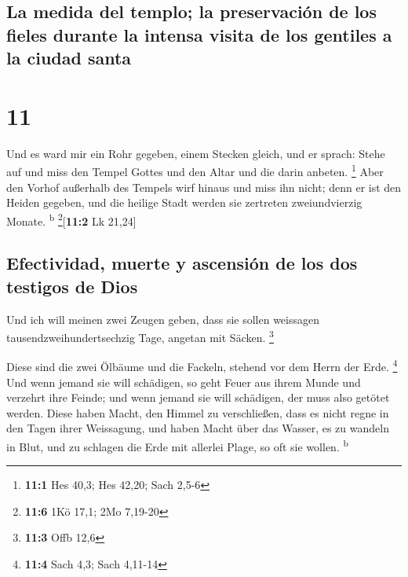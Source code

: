 \hypertarget{la-medida-del-templo-la-preservaciuxf3n-de-los-fieles-durante-la-intensa-visita-de-los-gentiles-a-la-ciudad-santa}{%
\subsection{La medida del templo; la preservación de los fieles durante
la intensa visita de los gentiles a la ciudad
santa}\label{la-medida-del-templo-la-preservaciuxf3n-de-los-fieles-durante-la-intensa-visita-de-los-gentiles-a-la-ciudad-santa}}

\hypertarget{section-10}{%
\section{11}\label{section-10}}

 Und es ward mir ein Rohr gegeben, einem Stecken gleich,
und er sprach: Stehe auf und miss den Tempel Gottes und den Altar und
die darin anbeten. \footnote{\textbf{11:1} Hes 40,3; Hes 42,20; Sach
  2,5-6}  Aber den Vorhof außerhalb des Tempels wirf
hinaus und miss ihn nicht; denn er ist den Heiden gegeben, und die
heilige Stadt werden sie zertreten zweiundvierzig Monate.
\textsuperscript{b} \footnote{\textbf{11:6} 1Kö 17,1; 2Mo 7,19-20}{[}\textbf{11:2}
Lk 21,24{]}

\hypertarget{efectividad-muerte-y-ascensiuxf3n-de-los-dos-testigos-de-dios}{%
\subsection{Efectividad, muerte y ascensión de los dos testigos de
Dios}\label{efectividad-muerte-y-ascensiuxf3n-de-los-dos-testigos-de-dios}}

 Und ich will meinen zwei Zeugen geben, dass sie sollen
weissagen tausendzweihundertsechzig Tage, angetan mit Säcken.
\footnote{\textbf{11:3} Offb 12,6}

 Diese sind die zwei Ölbäume und die Fackeln, stehend vor
dem Herrn der Erde. \footnote{\textbf{11:4} Sach 4,3; Sach 4,11-14}
 Und wenn jemand sie will schädigen, so geht Feuer aus
ihrem Munde und verzehrt ihre Feinde; und wenn jemand sie will
schädigen, der muss also getötet werden.  Diese haben
Macht, den Himmel zu verschließen, dass es nicht regne in den Tagen
ihrer Weissagung, und haben Macht über das Wasser, es zu wandeln in
Blut, und zu schlagen die Erde mit allerlei Plage, so oft sie wollen.
\textsuperscript{b}


